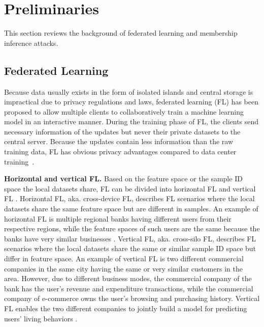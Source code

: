 \documentclass[10pt,journal,compsoc]{IEEEtran}
\begin{document}
\section{Preliminaries}\label{sec::02}
This section reviews the background of federated learning and membership inference attacks.


\subsection{Federated Learning}\label{sec::pre_fl}
Because data usually exists in the form of isolated islands and central storage is impractical due to privacy regulations and laws, federated learning (FL) has been proposed to allow multiple clients to collaboratively train a machine learning model in an interactive manner. During the training phase of FL, the clients send necessary information of the updates but never their private datasets to the central server. Because the updates contain less information than the raw training data, FL has obvious privacy advantages compared to data center training~\cite{mcmahan2017communication}.

\noindent \textbf{Horizontal and vertical FL.} Based on the feature space or the sample ID space the local datasets share, FL can be divided into horizontal FL and vertical FL \cite{yang2019federated,li2021survey}. Horizontal FL, aka. cross-device FL, describes FL scenarios where the local datasets share the same feature space but are different in samples. An example of horizontal FL is multiple regional banks having different users from their respective regions, while the feature spaces of such users are the same because the banks have very similar businesses \cite{cheng2020federated}. Vertical FL, aka. cross-silo FL, describes FL scenarios where the local datasets share the same or similar sample ID space but differ in feature space. An example of vertical FL is two different commercial companies in the same city having the same or very similar customers in the area. However, due to different business modes, the commercial company of the bank has the user’s revenue and expenditure transactions, while the commercial company of e-commerce owns the user’s browsing and purchasing history. Vertical FL enables the two different companies to jointly build a model for predicting users' living behaviors \cite{yang2019federated}.
\end{document}
